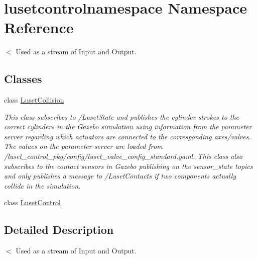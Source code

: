 \hypertarget{namespacelusetcontrolnamespace}{}\section{lusetcontrolnamespace Namespace Reference}
\label{namespacelusetcontrolnamespace}


$<$ Used as a stream of Input and Output.  


\subsection*{Classes}
\begin{DoxyCompactItemize}
\item 
class \hyperlink{classlusetcontrolnamespace_1_1LusetCollision}{Luset\+Collision}
\begin{DoxyCompactList}\small\item\em This class subscribes to /\+Luset\+State and publishes the cylinder strokes to the correct cylinders in the Gazebo simulation using information from the parameter server regarding which actuators are connected to the corresponding axes/valves. The values on the parameter server are loaded from /luset\+\_\+control\+\_\+pkg/config/luset\+\_\+valve\+\_\+config\+\_\+standard.yaml. This class also subscribes to the contact sensors in Gazebo publishing on the sensor\+\_\+state topics and only publishes a message to /\+Luset\+Contacts if two components actually collide in the simulation. \end{DoxyCompactList}\item 
class \hyperlink{classlusetcontrolnamespace_1_1LusetControl}{Luset\+Control}
\end{DoxyCompactItemize}


\subsection{Detailed Description}
$<$ Used as a stream of Input and Output. 

